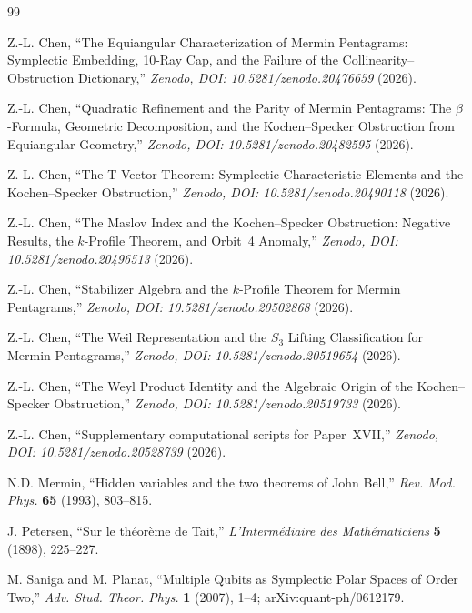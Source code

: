 \documentclass[11pt,a4paper]{article}
\theoremstyle{remark}
\begin{document}
\begin{thebibliography}{99}

Z.-L. Chen,
``The Equiangular Characterization of Mermin Pentagrams:
Symplectic Embedding, 10-Ray Cap, and the Failure of the
Collinearity--Obstruction Dictionary,''
\textit{Zenodo, DOI: 10.5281/zenodo.20476659} (2026).

Z.-L. Chen,
``Quadratic Refinement and the Parity of Mermin Pentagrams:
The $\beta$-Formula, Geometric Decomposition, and the
Kochen--Specker Obstruction from Equiangular Geometry,''
\textit{Zenodo, DOI: 10.5281/zenodo.20482595} (2026).

Z.-L. Chen,
``The T-Vector Theorem: Symplectic Characteristic Elements
and the Kochen--Specker Obstruction,''
\textit{Zenodo, DOI: 10.5281/zenodo.20490118} (2026).

Z.-L. Chen,
``The Maslov Index and the Kochen--Specker Obstruction:
Negative Results, the $k$-Profile Theorem, and Orbit~4 Anomaly,''
\textit{Zenodo, DOI: 10.5281/zenodo.20496513} (2026).

Z.-L. Chen,
``Stabilizer Algebra and the $k$-Profile Theorem for Mermin Pentagrams,''
\textit{Zenodo, DOI: 10.5281/zenodo.20502868} (2026).

Z.-L. Chen,
``The Weil Representation and the $S_3$ Lifting Classification
for Mermin Pentagrams,''
\textit{Zenodo, DOI: 10.5281/zenodo.20519654} (2026).

Z.-L. Chen,
``The Weyl Product Identity and the Algebraic Origin
of the Kochen--Specker Obstruction,''
\textit{Zenodo, DOI: 10.5281/zenodo.20519733} (2026).

Z.-L. Chen,
``Supplementary computational scripts for Paper~XVII,''
\textit{Zenodo, DOI: 10.5281/zenodo.20528739} (2026).

N.D. Mermin,
``Hidden variables and the two theorems of John Bell,''
\textit{Rev. Mod. Phys.} \textbf{65} (1993), 803--815.

J. Petersen,
``Sur le th\'eor\`eme de Tait,''
\textit{L'Interm\'ediaire des Math\'ematiciens} \textbf{5} (1898), 225--227.

M. Saniga and M. Planat,
``Multiple Qubits as Symplectic Polar Spaces of Order Two,''
\textit{Adv. Stud. Theor. Phys.} \textbf{1} (2007), 1--4;
arXiv:quant-ph/0612179.


\end{thebibliography}
\end{document}
